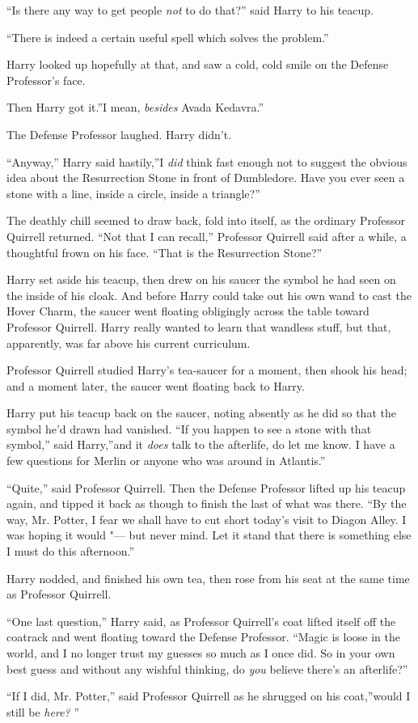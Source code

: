 ``Is there any way to get people \emph{not} to do that?'' said Harry to
his teacup.

``There is indeed a certain useful spell which solves the problem.''

Harry looked up hopefully at that, and saw a cold, cold smile on the
Defense Professor's face.

Then Harry got it.''I mean, \emph{besides} Avada Kedavra.''

The Defense Professor laughed. Harry didn't.

``Anyway,'' Harry said hastily,''I \emph{did} think fast enough not to
suggest the obvious idea about the Resurrection Stone in front of
Dumbledore. Have you ever seen a stone with a line, inside a circle,
inside a triangle?''

The deathly chill seemed to draw back, fold into itself, as the ordinary
Professor Quirrell returned. ``Not that I can recall,'' Professor
Quirrell said after a while, a thoughtful frown on his face. ``That is
the Resurrection Stone?''

Harry set aside his teacup, then drew on his saucer the symbol he had
seen on the inside of his cloak. And before Harry could take out his own
wand to cast the Hover Charm, the saucer went floating obligingly across
the table toward Professor Quirrell. Harry really wanted to learn that
wandless stuff, but that, apparently, was far above his current
curriculum.

Professor Quirrell studied Harry's tea-saucer for a moment, then shook
his head; and a moment later, the saucer went floating back to Harry.

Harry put his teacup back on the saucer, noting absently as he did so
that the symbol he'd drawn had vanished. ``If you happen to see a stone
with that symbol,'' said Harry,''and it \emph{does} talk to the
afterlife, do let me know. I have a few questions for Merlin or anyone
who was around in Atlantis.''

``Quite,'' said Professor Quirrell. Then the Defense Professor lifted up
his teacup again, and tipped it back as though to finish the last of
what was there. ``By the way, Mr. Potter, I fear we shall have to cut
short today's visit to Diagon Alley. I was hoping it would "--- but never
mind. Let it stand that there is something else I must do this
afternoon.''

Harry nodded, and finished his own tea, then rose from his seat at the
same time as Professor Quirrell.

``One last question,'' Harry said, as Professor Quirrell's coat lifted
itself off the coatrack and went floating toward the Defense Professor.
``Magic is loose in the world, and I no longer trust my guesses so much
as I once did. So in your own best guess and without any wishful
thinking, do \emph{you} believe there's an afterlife?''

``If I did, Mr. Potter,'' said Professor Quirrell as he shrugged on his
coat,''would I still be \emph{here?} ''
